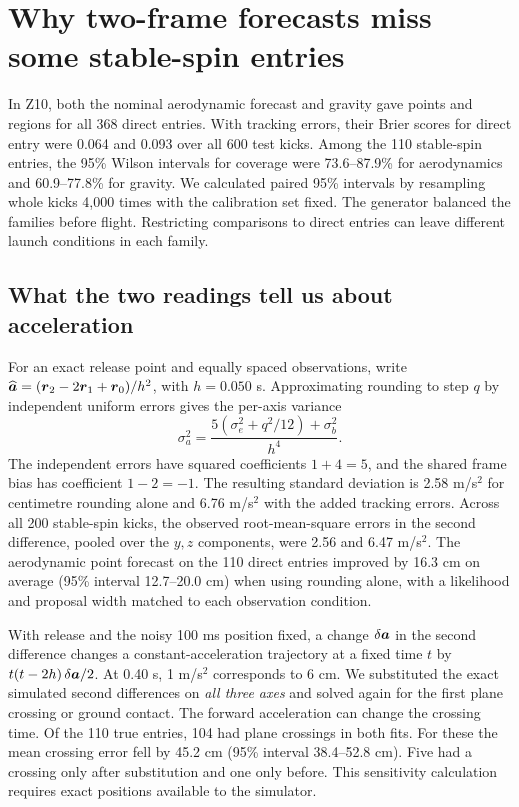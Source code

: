 \section{Why two-frame forecasts miss some stable-spin entries}
\label{app:stable-spin}

In Z10, both the nominal aerodynamic forecast and gravity gave points and regions for all 368 direct entries. With tracking errors, their Brier scores for direct entry were 0.064 and 0.093 over all 600 test kicks. Among the 110 stable-spin entries, the 95\% Wilson intervals for coverage were 73.6--87.9\% for aerodynamics and 60.9--77.8\% for gravity. We calculated paired 95\% intervals by resampling whole kicks 4,000 times with the calibration set fixed. The generator balanced the families before flight. Restricting comparisons to direct entries can leave different launch conditions in each family.

\subsection{What the two readings tell us about acceleration}
For an exact release point and equally spaced observations, write \(\widehat{\boldsymbol{a}}=(\boldsymbol{r}_2-2\boldsymbol{r}_1+\boldsymbol{r}_0)/h^2\), with \(h=0.050\) s. Approximating rounding to step \(q\) by independent uniform errors gives the per-axis variance
\[
 \sigma_a^2=\frac{5(\sigma_e^2+q^2/12)+\sigma_b^2}{h^4}.
\]
The independent errors have squared coefficients \(1+4=5\), and the shared frame bias has coefficient \(1-2=-1\). The resulting standard deviation is 2.58 m/s\(^2\) for centimetre rounding alone and 6.76 m/s\(^2\) with the added tracking errors. Across all 200 stable-spin kicks, the observed root-mean-square errors in the second difference, pooled over the \(y,z\) components, were 2.56 and 6.47 m/s\(^2\). The aerodynamic point forecast on the 110 direct entries improved by 16.3 cm on average (95\% interval 12.7--20.0 cm) when using rounding alone, with a likelihood and proposal width matched to each observation condition.

With release and the noisy 100 ms position fixed, a change \(\delta\boldsymbol{a}\) in the second difference changes a constant-acceleration trajectory at a fixed time \(t\) by \(t(t-2h)\,\delta\boldsymbol{a}/2\). At 0.40 s, 1 m/s\(^2\) corresponds to 6 cm. We substituted the exact simulated second differences on \emph{all three axes} and solved again for the first plane crossing or ground contact. The forward acceleration can change the crossing time. Of the 110 true entries, 104 had plane crossings in both fits. For these the mean crossing error fell by 45.2 cm (95\% interval 38.4--52.8 cm). Five had a crossing only after substitution and one only before. This sensitivity calculation requires exact positions available to the simulator.

